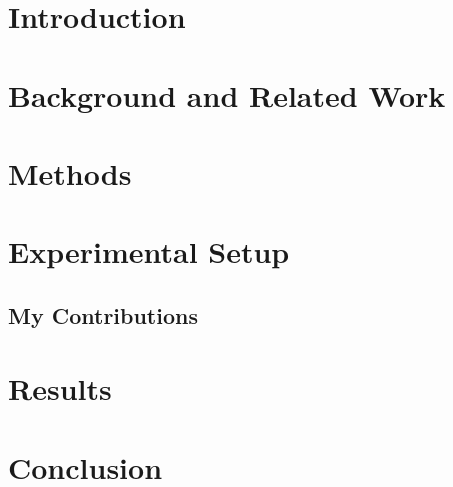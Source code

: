 
\newpage

\section{Introduction}

\section{Background and Related Work}

\section{Methods}


\section{Experimental Setup}

\subsection{My Contributions}

\section{Results}


\section{Conclusion}